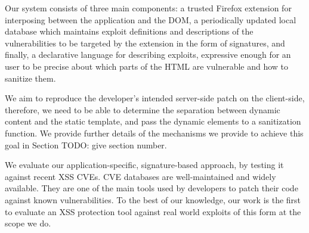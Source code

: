  Our system consists of three main components: a trusted Firefox extension for interposing between the application and the DOM, a periodically updated local database which maintains exploit definitions and descriptions of the vulnerabilities to be targeted by the extension in the form of signatures, and finally, a declarative language for describing exploits, expressive enough for an user to be precise about which parts of the HTML are vulnerable and how to sanitize them.
 
 We aim to reproduce the developer's intended server-side patch on the client-side, therefore, we need to be able to determine the separation between dynamic content and the static template, and pass the dynamic elements to a sanitization function. We provide further details of the mechanisms we provide to achieve this goal in Section TODO: give section number.
 
 We evaluate our application-specific, signature-based approach, by testing it against recent XSS CVEs. CVE databases are well-maintained and widely available. They are one of the main tools used by developers to patch their code against known vulnerabilities. To the best of our knowledge, our work is the first to evaluate an XSS protection tool against real world exploits of this form at the scope we do.


